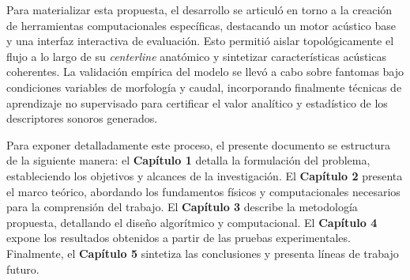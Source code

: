 Para materializar esta propuesta, el desarrollo se articuló en torno a la creación de herramientas computacionales específicas, destacando un motor acústico base y una interfaz interactiva de evaluación. Esto permitió aislar topológicamente el flujo a lo largo de su \textit{centerline} anatómico y sintetizar características acústicas coherentes. La validación empírica del modelo se llevó a cabo sobre fantomas bajo condiciones variables de morfología y caudal, incorporando finalmente técnicas de aprendizaje no supervisado para certificar el valor analítico y estadístico de los descriptores sonoros generados.

Para exponer detalladamente este proceso, el presente documento se estructura de la siguiente manera: el \textbf{Capítulo 1} detalla la formulación del problema, estableciendo los objetivos y alcances de la investigación. El \textbf{Capítulo 2} presenta el marco teórico, abordando los fundamentos físicos y computacionales necesarios para la comprensión del trabajo. El \textbf{Capítulo 3} describe la metodología propuesta, detallando el diseño algorítmico y computacional. El \textbf{Capítulo 4} expone los resultados obtenidos a partir de las pruebas experimentales. Finalmente, el \textbf{Capítulo 5} sintetiza las conclusiones y presenta líneas de trabajo futuro.
